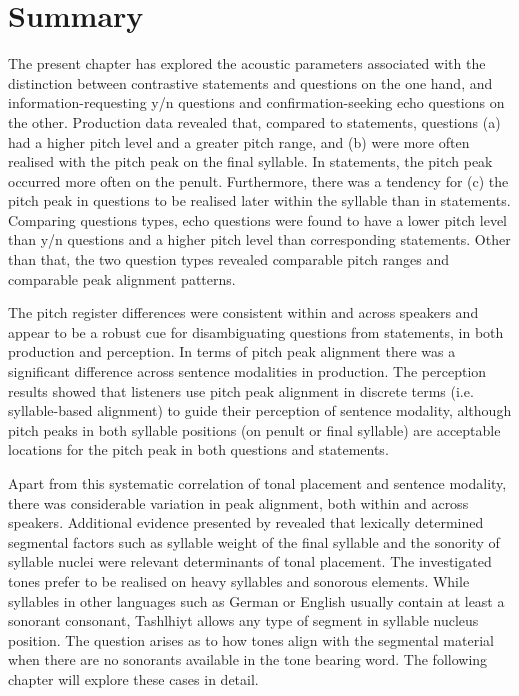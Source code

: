 \largerpage
\section{Summary}\label{sec:5.7}
The present chapter has explored the acoustic parameters associated with the distinction between contrastive statements and questions on the one hand, and information-requesting y/n questions and confirmation-seeking echo questions on the other. Production data revealed that, compared to statements, questions (a) had a higher pitch level and a greater pitch range, and (b) were more often realised with the pitch peak on the final syllable. In statements, the pitch peak occurred more often on the penult. Furthermore, there was a tendency for (c) the pitch peak in questions to be realised later within the syllable than in statements. Comparing questions types, echo questions were found to have a lower pitch level than y/n questions and a higher pitch level than corresponding statements. Other than that, the two question types revealed comparable pitch ranges and comparable peak alignment patterns.

The pitch register differences were consistent within and across speakers and appear to be a robust cue for disambiguating questions from statements, in both production and perception. In terms of pitch peak alignment there was a significant difference across sentence modalities in production. The perception results showed that listeners use pitch peak alignment in discrete terms (i.e. syllable-based alignment) to guide their perception of sentence modality, although pitch peaks in both syllable positions (on penult or final syllable) are acceptable locations for the pitch peak in both questions and statements. 

Apart from this systematic correlation of tonal placement and sentence modality, there was considerable variation in peak alignment, both within and across speakers. Additional evidence presented by \citet{Grice.etal2015tash} revealed that lexically determined segmental factors such as syllable weight of the final syllable and the sonority of syllable nuclei were relevant determinants of tonal placement. The investigated tones prefer to be realised on heavy syllables and sonorous elements. While syllables in other languages such as German or English usually contain at least a sonorant consonant, Tashlhiyt allows any type of segment in syllable nucleus position. The question arises as to how tones align with the segmental material when there are no sonorants available in the tone bearing word. The following chapter will explore these cases in detail.
